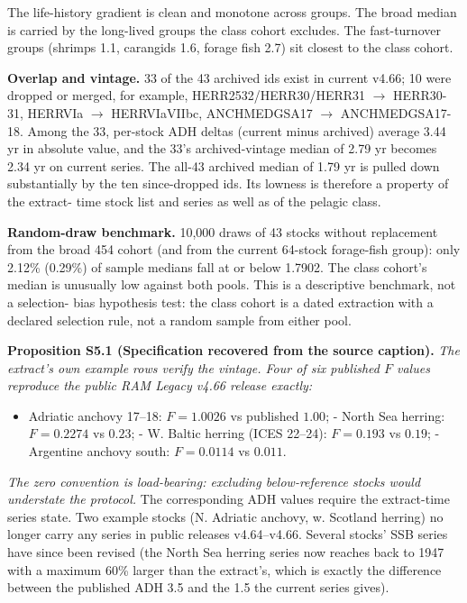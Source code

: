 \documentclass[11pt]{article}
\begin{document}
The life-history gradient is clean and monotone across groups. The broad median is carried by the long-lived groups the class cohort excludes. The fast-turnover groups (shrimps 1.1, carangids 1.6, forage fish 2.7) sit closest to the class cohort.

\textbf{Overlap and vintage.} 33 of the 43 archived ids exist in current v4.66; 10 were dropped or merged, for example, HERR2532/\allowbreak{}HERR30/\allowbreak{}HERR31 \(\to\) HERR30-31, HERRVIa \(\to\) HERRVIaVIIbc, ANCHMEDGSA17 \(\to\) ANCHMEDGSA17-18. Among the 33, per-stock ADH deltas (current minus archived) average 3.44 yr in absolute value, and the 33's archived-vintage median of 2.79 yr becomes 2.34 yr on current series. The all-43 archived median of 1.79 yr is pulled down substantially by the ten since-dropped ids. Its lowness is therefore a property of the extract- time stock list and series as well as of the pelagic class.

\textbf{Random-draw benchmark.} 10,000 draws of 43 stocks without replacement from the broad 454 cohort (and from the current 64-stock forage-fish group): only 2.12\% (0.29\%) of sample medians fall at or below 1.7902. The class cohort's median is unusually low against both pools. This is a descriptive benchmark, not a selection- bias hypothesis test: the class cohort is a dated extraction with a declared selection rule, not a random sample from either pool.

\textbf{Proposition S5.1 (Specification recovered from the source caption).} \emph{The extract's own example rows verify the vintage. Four of six published \(F\) values reproduce the public RAM Legacy v4.66 release exactly:}

\begin{itemize}\setlength{\itemsep}{2pt}
\item Adriatic anchovy 17--18: \(F = 1.0026\) vs published \(1.00\); - North Sea herring: \(F = 0.2274\) vs \(0.23\); - W. Baltic herring (ICES 22--24): \(F = 0.193\) vs \(0.19\); - Argentine anchovy south: \(F = 0.0114\) vs \(0.011\).
\end{itemize}

\emph{The zero convention is load-bearing: excluding below-reference stocks would understate the protocol.} The corresponding ADH values require the extract-time series state. Two example stocks (N. Adriatic anchovy, w. Scotland herring) no longer carry any series in public releases v4.64--v4.66. Several stocks' SSB series have since been revised (the North Sea herring series now reaches back to 1947 with a maximum 60\% larger than the extract's, which is exactly the difference between the published ADH 3.5 and the 1.5 the current series gives).
\end{document}
